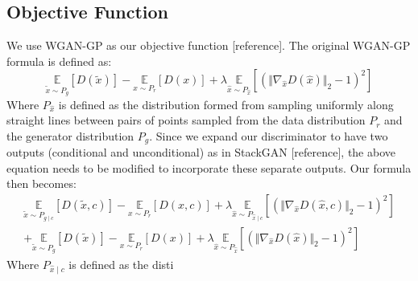 \subsection{Objective Function}
We use WGAN-GP as our objective function [reference]. The original WGAN-GP formula is defined as:
\begin{equation}
\underset{\tilde{x} \sim P_g}{\mathbb{E}}[D(\tilde{x})] - \underset{x \sim P_r}{\mathbb{E}}[D(x)] + \lambda \underset{\hat{x} \sim P_\hat{x}}{\mathbb{E}}[(\Vert \nabla_\hat{x} D(\hat{x}) \Vert_2 - 1)^2]
\end{equation}
Where $P_\hat{x}$ is defined as the distribution formed from sampling uniformly along straight lines between pairs of points sampled from the data distribution $P_r$ and the generator distribution $P_g$. Since we expand our discriminator to have two outputs (conditional and unconditional) as in StackGAN [reference], the above equation needs to be modified to incorporate these separate outputs. Our formula then becomes:
\begin{equation}
\begin{align*}
\underset{\tilde{x} \sim P_{g \mid c}}{\mathbb{E}}[D(\tilde{x}, c)] - \underset{x \sim P_r}{\mathbb{E}}[D(x, c)] + \lambda \underset{\hat{x} \sim P_{\hat{x} \mid c}}{\mathbb{E}}[(\Vert \nabla_\hat{x} D(\hat{x}, c) \Vert_2 - 1)^2] \\
+ \underset{\tilde{x} \sim P_g}{\mathbb{E}}[D(\tilde{x})] - \underset{x \sim P_r}{\mathbb{E}}[D(x)] + \lambda \underset{\hat{x} \sim P_\hat{x}}{\mathbb{E}}[(\Vert \nabla_\hat{x} D(\hat{x}) \Vert_2 - 1)^2]
\end{align*}
\end{equation}
Where $P_{\hat{x} \mid c}$ is defined as the disti